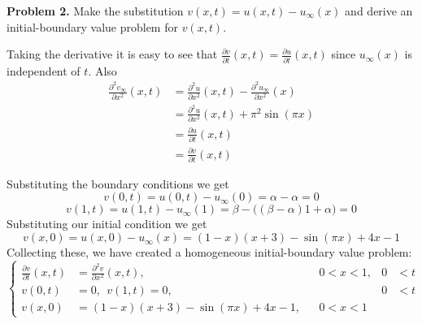 \documentclass[12pt]{article}
\newcommand{\problem}[1]{\hspace{-4 ex} \large \textbf{Problem #1} }
\begin{document}
\problem{2. } Make the substitution $v(x,t) = u(x,t) - u_\infty(x)$ and derive an initial-boundary value problem for $v(x,t)$. \bigbreak

Taking the derivative it is easy to see that $\frac{\partial v}{\partial t}(x,t) = \frac{\partial u}{\partial t}(x,t)$ since $u_\infty(x)$ is independent of $t$. Also
\begin{align*}
\frac{\partial^2v_\infty}{\partial x^2}(x,t) & = \frac{\partial^2u}{\partial x^2}(x,t) - \frac{\partial^2u_\infty}{\partial x^2}(x) \\
 & = \frac{\partial^2u}{\partial x^2}(x,t) + \pi^2\sin(\pi x) \\
 & = \frac{\partial u}{\partial t}(x,t) \\
 & = \frac{\partial v}{\partial t}(x,t)
\end{align*}

Substituting the boundary conditions we get
$$
v(0,t) = u(0,t) - u_\infty(0) = \alpha - \alpha = 0
$$
$$
v(1,t) = u(1,t) - u_\infty(1) = \beta - \big( (\beta - \alpha)1 + \alpha \big) = 0
$$
Substituting our initial condition we get
$$
v(x,0) = u(x,0) - u_\infty(x) = (1 - x)(x + 3) - \sin(\pi x) + 4x - 1
$$
Collecting these, we have created a homogeneous initial-boundary value problem:
\begin{equation}
\left \{
	\begin{aligned}
		\frac{\partial v}{\partial t}(x,t) & = \frac{\partial^2v}{\partial x^2}(x,t), && 0 <x <1, & 0&<t \\
		v(0,t) & = 0, \ \  v(1,t) = 0, && & 0 & < t \\
		v(x,0) & = (1 - x)(x + 3) - \sin(\pi x) + 4x - 1, && 0  < x < 1
	\end{aligned} 
\right . \label{eq2}
\end{equation}
\end{document}
